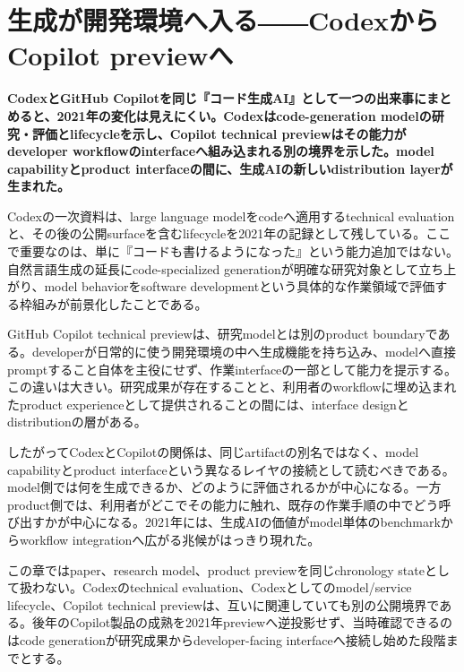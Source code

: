 \section{生成が開発環境へ入る――CodexからCopilot previewへ}
\label{pkg:code-developer-interface}
\noindent\textbf{CodexとGitHub Copilotを同じ『コード生成AI』として一つの出来事にまとめると、2021年の変化は見えにくい。Codexはcode-generation modelの研究・評価とlifecycleを示し、Copilot technical previewはその能力がdeveloper workflowのinterfaceへ組み込まれる別の境界を示した。model capabilityとproduct interfaceの間に、生成AIの新しいdistribution layerが生まれた。}\autocite{src-089fe2c6fbb1,src-47d0c87b08f0,src-5a992319f41e,src-890a73c0b288}

Codexの一次資料は、large language modelをcodeへ適用するtechnical evaluationと、その後の公開surfaceを含むlifecycleを2021年の記録として残している。ここで重要なのは、単に『コードも書けるようになった』という能力追加ではない。自然言語生成の延長にcode-specialized generationが明確な研究対象として立ち上がり、model behaviorをsoftware developmentという具体的な作業領域で評価する枠組みが前景化したことである。\autocite{src-47d0c87b08f0,src-5a992319f41e,src-890a73c0b288}


GitHub Copilot technical previewは、研究modelとは別のproduct boundaryである。developerが日常的に使う開発環境の中へ生成機能を持ち込み、modelへ直接promptすること自体を主役にせず、作業interfaceの一部として能力を提示する。この違いは大きい。研究成果が存在することと、利用者のworkflowに埋め込まれたproduct experienceとして提供されることの間には、interface designとdistributionの層がある。\autocite{src-089fe2c6fbb1}


したがってCodexとCopilotの関係は、同じartifactの別名ではなく、model capabilityとproduct interfaceという異なるレイヤの接続として読むべきである。model側では何を生成できるか、どのように評価されるかが中心になる。一方product側では、利用者がどこでその能力に触れ、既存の作業手順の中でどう呼び出すかが中心になる。2021年には、生成AIの価値がmodel単体のbenchmarkからworkflow integrationへ広がる兆候がはっきり現れた。\autocite{src-089fe2c6fbb1,src-47d0c87b08f0,src-5a992319f41e,src-890a73c0b288}


この章ではpaper、research model、product previewを同じchronology stateとして扱わない。Codexのtechnical evaluation、Codexとしてのmodel/service lifecycle、Copilot technical previewは、互いに関連していても別の公開境界である。後年のCopilot製品の成熟を2021年previewへ逆投影せず、当時確認できるのはcode generationが研究成果からdeveloper-facing interfaceへ接続し始めた段階までとする。\autocite{src-089fe2c6fbb1,src-47d0c87b08f0,src-5a992319f41e,src-890a73c0b288}


